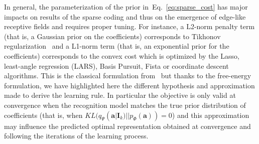 \documentclass[a4paper, 11pt, draft]{article} %
\newcommand{\coef}{\mathbf{a}} %
\newcommand{\image}{\mathbf{I}} %
\newcommand{\dico}{\Phi} %
\newcommand{\seeEq}[1]{Eq.~\ref{eq:#1}}%
\begin{document}
In general, the parameterization of the prior in~\seeEq{sparse_cost} has major impacts on results of the sparse coding and thus on the emergence of edge-like receptive fields and requires proper tuning. For instance, a L2-norm penalty term (that is, a Gaussian prior on the coefficients) corresponds to Tikhonov regularization~\citep{Tikhonov77} and a L1-norm term (that is, an exponential prior for the coefficients) corresponds to the convex cost which is optimized by the Lasso, least-angle regression (LARS), Basis Pursuit, Fista or coordinate descent algorithms. %
This is the classical formulation from~\citet{Olshausen97} but thanks to the free-energy formulation,  we have highlighted here the different hypothesis and approximation made to derive the learning rule. In particular the objective is only valid at convergence when the recognition model matches the true prior distribution of coefficients (that is, when $KL( q_\Psi(\coef | \image_k) || p_\dico(\coef) )=0$) and this approximation may influence the predicted optimal representation obtained at convergence and following the iterations of the learning process.%

\end{document}
